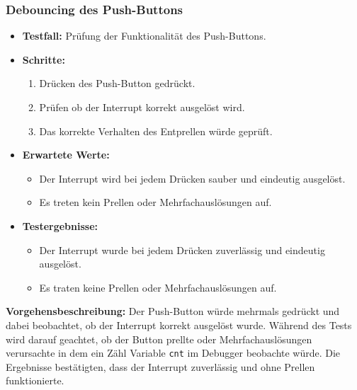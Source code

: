 \subsubsection{Debouncing des Push-Buttons}
\begin{itemize}
    \item \textbf{Testfall:} Prüfung der Funktionalität des Push-Buttons.
    \item \textbf{Schritte:}
    \begin{enumerate}
        \item Drücken des Push-Button gedrückt.
        \item Prüfen ob der Interrupt korrekt ausgelöst wird.
        \item Das korrekte Verhalten des Entprellen würde geprüft.
    \end{enumerate}
    \item \textbf{Erwartete Werte:}
    \begin{itemize}
        \item Der Interrupt wird bei jedem Drücken sauber und eindeutig ausgelöst.
        \item Es treten kein Prellen oder Mehrfachauslösungen auf.
    \end{itemize}
    \item \textbf{Testergebnisse:}
    \begin{itemize}
        \item Der Interrupt wurde bei jedem Drücken zuverlässig und eindeutig ausgelöst.
        \item Es traten keine Prellen oder Mehrfachauslösungen auf.
    \end{itemize}
\end{itemize}


\textbf{Vorgehensbeschreibung:}
Der Push-Button würde mehrmals gedrückt und dabei beobachtet, ob der Interrupt korrekt ausgelöst wurde. Während des Tests wird darauf geachtet, ob der Button prellte oder Mehrfachauslösungen verursachte in dem ein Zähl Variable \texttt{cnt} im Debugger beobachte würde. Die Ergebnisse bestätigten, dass der Interrupt zuverlässig und ohne Prellen funktionierte.

